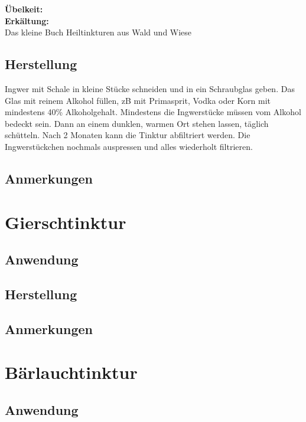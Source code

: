\textbf{Übelkeit:} \\ 

\textbf{Erkältung:} \\ 


Das kleine Buch Heiltinkturen aus Wald und Wiese


\subsection{Herstellung}

Ingwer mit Schale in kleine Stücke schneiden und in ein Schraubglas geben. Das Glas mit reinem Alkohol füllen, zB mit Primasprit, Vodka oder Korn mit mindestens 40\% Alkoholgehalt. Mindestens die Ingwerstücke müssen vom Alkohol bedeckt sein. Dann an einem dunklen, warmen Ort stehen lassen, täglich schütteln. Nach 2 Monaten kann die Tinktur abfiltriert werden. Die Ingwerstückchen nochmals auspressen und alles wiederholt filtrieren.

\subsection{Anmerkungen}




\section{Gierschtinktur}

\subsection{Anwendung}

\subsection{Herstellung}

\subsection{Anmerkungen}





\section{Bärlauchtinktur}

\subsection{Anwendung}

